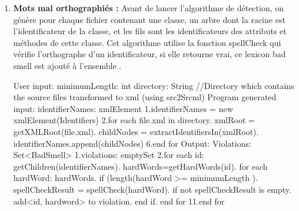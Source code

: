 \begin{enumerate}
\newline
\item \textbf {	Mots mal orthographiés :}
Avant de lancer l'algorithme de détection, on génère pour chaque fichier contenant une classe, un arbre dont la racine est l'identificateur de la classe, et les fils sont les identificateurs des attributs et méthodes de cette classe.
Cet algorithme utilise la fonction spellCheck qui vérifie l'orthographe d'un identificateur, si elle retourne vrai, ce lexicon bad smell est ajouté à l'ensemble \cite{abebe2009lexicon}.
\begin{framed}
  {\selectfont  
User input:\newline
 minimumLength: int\newline
 directory: String //Directory which contains the source files transformed to xml (using src2Srcml)\newline
 Program generated input:\newline
 identifierNames: xmlElement\newline
 1.identifierNames = new xmlElement(Identifiers)\newline
 2.for each file.xml in directory.	xmlRoot = getXMLRoot(file.xml).	childNodes = extractIdentifiersIn(xmlRoot).	identifierNames.append(childNodes)\newline
 6.end for\newline
 Output:\newline
 Violations: Set<BadSmell>\newline
 1.violations: emptySet\newline
 2.for each id: getChildren(identifierNames).	hardWords=getHardWords(id).	for each hardWord: hardWords.         if (length(hardWord >= minimumLength ).		spellCheckResult = spellCheck(hardWord).		if not spellCheckResult is empty.			add<id, hardword> to violation.         end if.     end for\newline
 11.end for\newline
 }
\end{framed}

\end{enumerate}
